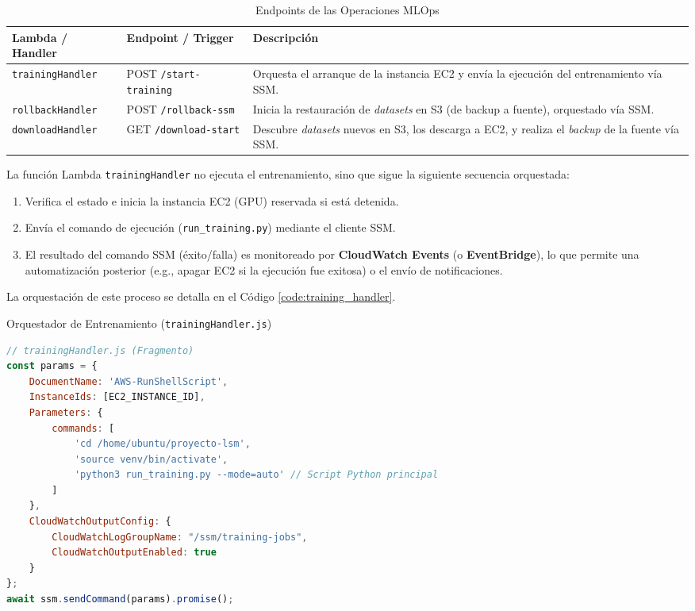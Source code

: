 \begin{table}[H]
    \centering
    \caption{Endpoints de las Operaciones MLOps}
    \renewcommand{\arraystretch}{1.3}
    \begin{tabularx}{\textwidth}{|p{4cm}|p{5cm}|X|}
        \hline
        \textbf{Lambda / Handler} & \textbf{Endpoint / Trigger} & \textbf{Descripción} \\ \hline
        \texttt{trainingHandler} & POST \texttt{/start-training} & Orquesta el arranque de la instancia EC2 y envía la ejecución del entrenamiento vía SSM. \\ \hline
        \texttt{rollbackHandler} & POST \texttt{/rollback-ssm} & Inicia la restauración de \textit{datasets} en S3 (de backup a fuente), orquestado vía SSM. \\ \hline
        \texttt{downloadHandler} & GET \texttt{/download-start} & Descubre \textit{datasets} nuevos en S3, los descarga a EC2, y realiza el \textit{backup} de la fuente vía SSM. \\ \hline
    \end{tabularx}
    \label{tab:mlops_endpoints}
\end{table}

La función Lambda \texttt{trainingHandler} no ejecuta el entrenamiento, sino que sigue la siguiente secuencia orquestada:

\begin{enumerate}
    \item Verifica el estado e inicia la instancia EC2 (GPU) reservada si está detenida.
    \item Envía el comando de ejecución (\texttt{run\_training.py}) mediante el cliente SSM.
    \item El resultado del comando SSM (éxito/falla) es monitoreado por \textbf{CloudWatch Events} (o \textbf{EventBridge}), lo que permite una automatización posterior (e.g., apagar EC2 si la ejecución fue exitosa) o el envío de notificaciones.
\end{enumerate}

La orquestación de este proceso se detalla en el Código \ref{code:training_handler}.

\begin{codebox}{Orquestador de Entrenamiento (\texttt{trainingHandler.js})}
\begin{lstlisting}[language=javascript, caption={Orquestador de Entrenamiento (\texttt{trainingHandler.js})}, label=code:training_handler]
// trainingHandler.js (Fragmento)
const params = {
    DocumentName: 'AWS-RunShellScript',
    InstanceIds: [EC2_INSTANCE_ID],
    Parameters: {
        commands: [
            'cd /home/ubuntu/proyecto-lsm',
            'source venv/bin/activate',
            'python3 run_training.py --mode=auto' // Script Python principal
        ]
    },
    CloudWatchOutputConfig: {
        CloudWatchLogGroupName: "/ssm/training-jobs",
        CloudWatchOutputEnabled: true
    }
};
await ssm.sendCommand(params).promise();
\end{lstlisting}
\end{codebox}

